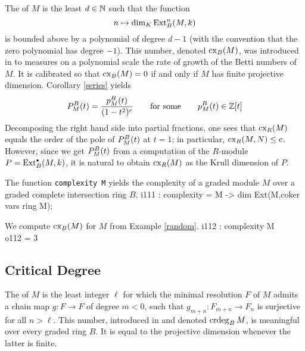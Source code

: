 The {\it{}\/} of $M$ is the least $d\in{\mathbb N}$ such that
the function
\[
n \mapsto \dim_K \operatorname{Ext}^n_B(M,k)
\]
is bounded above by a polynomial of degree $d-1$ (with the convention
that the zero polynomial has degree $-1$).  This number, denoted
$\operatorname{cx}_B(M)$, was introduced in
\cite{CI:MR90g:13027} to measures on a polynomial scale the rate of
growth of the Betti numbers of $M$.  It is calibrated so that
$\operatorname{cx}_B(M)=0$ if and only if $M$ has finite projective dimension.
Corollary \ref{series} yields
\[
{P}^B_M(t)=\frac{p^B_M(t)}{(1-t^2)^c}
\qquad\text{for some}\qquad p^B_M(t)\in{\mathbb Z}[t]
\]
Decomposing the right hand side into partial fractions, one sees that
$\operatorname{cx}_R(M)$ equals the order of the pole of ${P}^B_M(t)$ at $t=1$; in
particular, $\operatorname{cx}_R(M,N)\le c$.  However, since we get ${P}^B_M(t)$
from a computation of the $R$-module $P=\operatorname{Ext}^{\scriptscriptstyle\bullet}_B(M,k)$, it is natural
to obtain $\operatorname{cx}_R(M)$ as the Krull dimension of $P$.

\begin{sCode}
The function {\tt complexity M} yields the complexity of a graded
module $M$ over a graded complete intersection ring $B$.
\beginOutput
i111 : complexity = M -> dim Ext(M,coker vars ring M);\\
\endOutput
 \end{sCode}

\begin{sExample}
We compute $\operatorname{cx}_B(M)$ for $M$ from Example \ref{random}.
\beginOutput
i112 : complexity M\\
\emptyLine
o112 = 3\\
\endOutput
 \end{sExample}

\subsection{Critical Degree}

The {\it{}\/} of $M$ is the least integer $\ell$ for
which the minimal resolution $F$ of $M$ admits a chain map $g\colon
F\to F$ of degree $m<0$, such that $g_{m+n}\colon F_{m+n}\to F_n$ is
surjective for all $n>\ell$.  This number, introduced in
\cite{CI:MR99c:13033} and denoted $\operatorname{crdeg}_BM$, is meaningful over every
graded ring $B$.  It is equal to the projective dimension whenever the
latter is finite.

